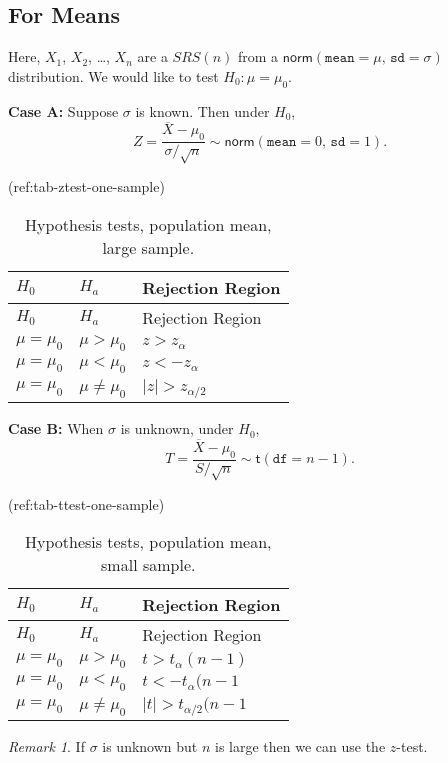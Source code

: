 \documentclass[]{book}
\numberwithin{equation}{chapter}
\numberwithin{figure}{chapter}
\theoremstyle{plain}
\theoremstyle{definition}
\theoremstyle{remark}
\theoremstyle{definition}
\theoremstyle{definition}
\theoremstyle{remark}
\newtheorem*{remark}{Remark}
\begin{document}
\subsection{For Means}\label{for-means}

Here, \(X_{1}\), \(X_{2}\), \ldots{}, \(X_{n}\) are a \(SRS(n)\) from a
\(\mathsf{norm}(\mathtt{mean} = \mu,\,\mathtt{sd} = \sigma)\)
distribution. We would like to test \(H_{0}:\mu = \mu_{0}\).

\textbf{Case A:} Suppose \(\sigma\) is known. Then under \(H_{0}\), \[
   Z = \frac{\overline{X} - \mu_{0}}{\sigma/\sqrt{n}} \sim \mathsf{norm}(\mathtt{mean} = 0,\,\mathtt{sd} = 1).
   \]

(ref:tab-ztest-one-sample)

\begin{longtable}[]{@{}lll@{}}
\caption{Hypothesis tests, population mean, large
sample.}\tabularnewline
\toprule
\(H_{0}\) & \(H_{a}\) & Rejection Region\tabularnewline
\midrule
\endfirsthead
\toprule
\(H_{0}\) & \(H_{a}\) & Rejection Region\tabularnewline
\midrule
\endhead
\(\mu = \mu_{0}\) & \(\mu > \mu_{0}\) &
\(z > z_{\alpha}\)\tabularnewline
\(\mu = \mu_{0}\) & \(\mu < \mu_{0}\) &
\(z < -z_{\alpha}\)\tabularnewline
\(\mu = \mu_{0}\) & \(\mu \neq \mu_{0}\) &
\(\vert z \vert > z_{\alpha/2}\)\tabularnewline
\bottomrule
\end{longtable}

\textbf{Case B:} When \(\sigma\) is unknown, under \(H_{0}\), \[
   T = \frac{\overline{X} - \mu_{0}}{S/\sqrt{n}} \sim \mathsf{t}(\mathtt{df} = n - 1).
   \]

(ref:tab-ttest-one-sample)

\begin{longtable}[]{@{}lll@{}}
\caption{Hypothesis tests, population mean, small
sample.}\tabularnewline
\toprule
\(H_{0}\) & \(H_{a}\) & Rejection Region\tabularnewline
\midrule
\endfirsthead
\toprule
\(H_{0}\) & \(H_{a}\) & Rejection Region\tabularnewline
\midrule
\endhead
\(\mu = \mu_{0}\) & \(\mu > \mu_{0}\) &
\(t > t_{\alpha}(n - 1)\)\tabularnewline
\(\mu = \mu_{0}\) & \(\mu < \mu_{0}\) &
\(t < -t_{\alpha}(n - 1\)\tabularnewline
\(\mu = \mu_{0}\) & \(\mu \neq \mu_{0}\) &
\(\vert t \vert > t_{\alpha/2}(n - 1\)\tabularnewline
\bottomrule
\end{longtable}

\bigskip

\begin{remark}
If \(\sigma\) is unknown but \(n\) is large then we can use the
\(z\)-test.
\end{remark}
\end{document}
